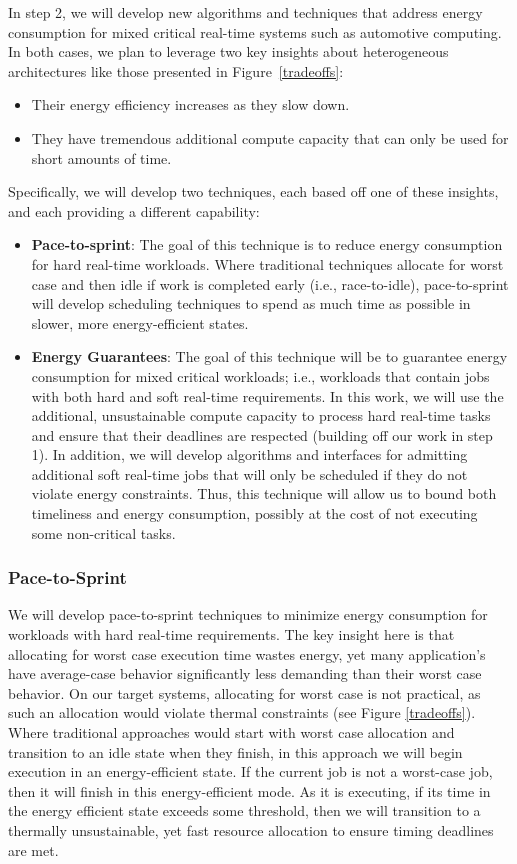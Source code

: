In step 2, we will develop new algorithms and techniques that address
energy consumption for mixed critical real-time systems such as
automotive computing.  In both cases, we plan to leverage two key
insights about heterogeneous architectures like those presented in
Figure~\ref{tradeoffs}:
\begin{itemize}
\item Their energy efficiency increases as they slow down.
\item They have tremendous additional compute capacity that can only
  be used for short amounts of time.
\end{itemize}

Specifically, we will develop two techniques, each based off one of
these insights, and each providing a different capability:
\begin{itemize}
\item \textbf{Pace-to-sprint}: The goal of this technique is to reduce
  energy consumption for hard real-time workloads.  Where traditional
  techniques allocate for worst case and then idle if work is
  completed early (i.e., race-to-idle), pace-to-sprint will develop
  scheduling techniques to spend as much time as possible in slower,
  more energy-efficient states.
\item \textbf{Energy Guarantees}: The goal of this technique will be
  to guarantee energy consumption for mixed critical workloads; i.e.,
  workloads that contain jobs with both hard and soft real-time
  requirements.  In this work, we will use the additional,
  unsustainable compute capacity to process hard real-time tasks and
  ensure that their deadlines are respected (building off our work in
  step 1).  In addition, we will develop algorithms and interfaces for
  admitting additional soft real-time jobs that will only be scheduled
  if they do not violate energy constraints.  Thus, this technique
  will allow us to bound both timeliness and energy consumption,
  possibly at the cost of not executing some non-critical tasks.
\end{itemize}


\subsubsection{Pace-to-Sprint}
We will develop pace-to-sprint techniques to minimize energy
consumption for workloads with hard real-time requirements.  The key
insight here is that allocating for worst case execution time wastes
energy, yet many application's have average-case behavior
significantly less demanding than their worst case behavior.  On our
target systems, allocating for worst case is not practical, as such an
allocation would violate thermal constraints (see Figure
\ref{tradeoffs}).  Where traditional approaches would start with worst
case allocation and transition to an idle state when they finish, in
this approach we will begin execution in an energy-efficient state.
If the current job is not a worst-case job, then it will finish in
this energy-efficient mode.  As it is executing, if its time in the
energy efficient state exceeds some threshold, then we will
transition to a thermally unsustainable, yet fast resource allocation
to ensure timing deadlines are met.

